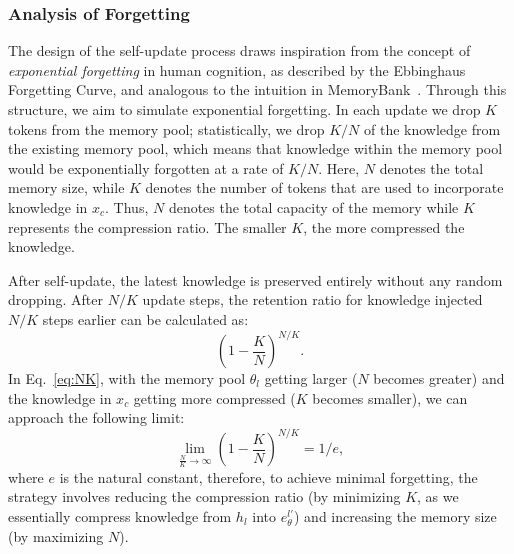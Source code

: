 \documentclass{article}
\theoremstyle{plain}
\theoremstyle{definition}
\theoremstyle{remark}
\begin{document}
\subsubsection{Analysis of Forgetting}
\label{sec:aof}
The design of the self-update process draws inspiration from the concept of \textit{exponential forgetting} in human cognition, as described by the Ebbinghaus Forgetting Curve, and analogous to the intuition in MemoryBank~\citep{MemoryBank}. 
Through this structure, we aim to simulate exponential forgetting. In each update we drop $K$ tokens from the memory pool; statistically, we drop $K/N$ of the knowledge from the existing memory pool, which means that knowledge within the memory pool would be exponentially forgotten at a rate of $K/N$. 
Here, $N$ denotes the total memory size, while $K$ denotes the number of tokens that are used to incorporate knowledge in $x_c$. Thus, $N$ denotes the total capacity of the memory while $K$ represents the compression ratio. The smaller $K$, the more compressed the knowledge. 

After self-update, the latest knowledge is preserved entirely without any random dropping. After $N/K$ update steps, the retention ratio for knowledge injected $N/K$ steps earlier can be calculated as:
\begin{equation}\label{eq:NK}
    (1 - \frac{K}{N})^{N/K}.
\end{equation}
In Eq.~\ref{eq:NK}, with the memory pool $\theta_l$ getting larger ($N$ becomes greater) and the knowledge in $x_c$ getting more compressed ($K$ becomes smaller), we can approach the following limit: 
\begin{equation}\label{eq:NK_limit}
    \lim_{\frac{N}{K}\rightarrow \infty} (1 - \frac{K}{N})^{N/K} = 1/e,
\end{equation}
where $e$ is the natural constant, therefore, to achieve minimal forgetting, the strategy involves reducing the compression ratio (by minimizing $K$, as we essentially compress knowledge from $h_l$ into $e_\theta^{l'}$) and increasing the memory size (by maximizing $N$).
\end{document}
